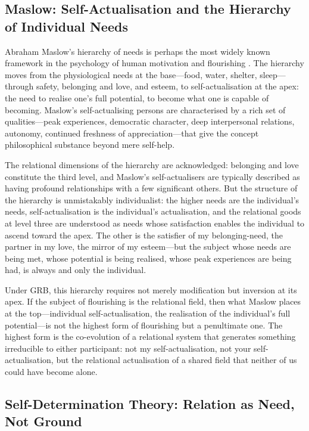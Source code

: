 \subsection{Maslow: Self-Actualisation and the Hierarchy of Individual Needs}
\label{p14:subsec:maslow}

\noindent
Abraham Maslow's hierarchy of needs is perhaps the most widely known framework in the psychology of human motivation and flourishing \parencite{maslow1954}. The hierarchy moves from the physiological needs at the base---food, water, shelter, sleep---through safety, belonging and love, and esteem, to self-actualisation at the apex: the need to realise one's full potential, to become what one is capable of becoming. Maslow's self-actualising persons are characterised by a rich set of qualities---peak experiences, democratic character, deep interpersonal relations, autonomy, continued freshness of appreciation---that give the concept philosophical substance beyond mere self-help.

The relational dimensions of the hierarchy are acknowledged: belonging and love constitute the third level, and Maslow's self-actualisers are typically described as having profound relationships with a few significant others. But the structure of the hierarchy is unmistakably individualist: the higher needs are the individual's needs, self-actualisation is the individual's actualisation, and the relational goods at level three are understood as needs whose satisfaction enables the individual to ascend toward the apex. The other is the satisfier of my belonging-need, the partner in my love, the mirror of my esteem---but the subject whose needs are being met, whose potential is being realised, whose peak experiences are being had, is always and only the individual.

Under GRB, this hierarchy requires not merely modification but inversion at its apex. If the subject of flourishing is the relational field, then what Maslow places at the top---individual self-actualisation, the realisation of the individual's full potential---is not the highest form of flourishing but a penultimate one. The highest form is the co-evolution of a relational system that generates something irreducible to either participant: not my self-actualisation, not your self-actualisation, but the relational actualisation of a shared field that neither of us could have become alone.

\subsection{Self-Determination Theory: Relation as Need, Not Ground}
\label{p14:subsec:sdt}

